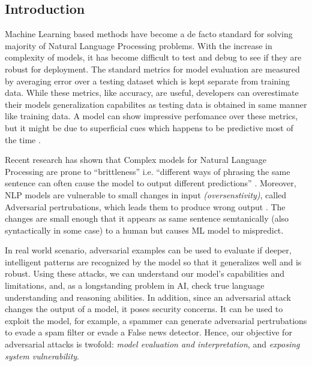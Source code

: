 \documentclass[12pt]{report}
\begin{document}


\begin{spacing}{1.5}
\chapter{Introduction}

Machine Learning based methods have become a de facto standard for solving majority of Natural Language Processing problems. 
With the increase in complexity of models, it has become difficult to test and debug to see if they are robust for deployment.
The standard metrics for model evaluation are measured by averaging error over a testing dataset which is kept separate from training data.
While these metrics, like accuracy, are useful, developers can overestimate their models generalization capabilites as testing data is obtained in same manner like training data.
A  model can show impressive perfomance over these metrics, but it might be due to superficial cues which happens to be predictive most of the time \cite{jia2019}.

Recent research has shown that Complex models for Natural Language Processing are prone to ``brittleness'' i.e. ``different ways of phrasing the same sentence can often cause the model to output different predictions'' \cite{riberio2018}.
Moreover, NLP models are vulnerable to small changes in input \textit{(oversenstivity)}, called Adversarial pertrubations, which leads them to produce wrong output \cite{liang2018}.
The changes are small enough that it appears as same sentence semtanically (also syntactically in some case) to a human but causes ML model to mispredict.

In real world scenario, adversarial examples can be used to evaluate if deeper, intelligent patterns are recognized by the model so that it generalizes well and is robust.
Using these attacks, we can understand our model's capabilities and limitations, and, as a longstanding problem in AI, check true language understanding and reasoning abilities.
In addition, since an adversarial attack changes the output of a model, it poses security concerns. It can be used to exploit the model, for example, a spammer can generate adversarial pertrubations to evade a spam filter or evade a False news detector.
Hence, our objective for adversarial attacks is twofold: \textit{model evaluation and interpretation}, and \textit{exposing system vulnerability}.


\end{spacing}
\end{document}
